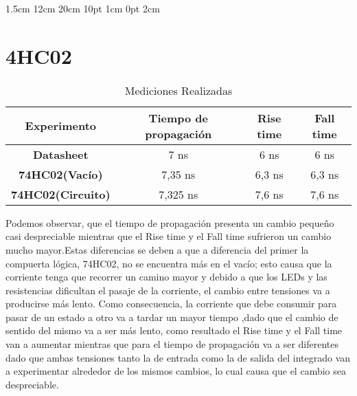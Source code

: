 \documentclass{report}
\begin{document}
\setmargins{2.5cm}   %
{1.5cm}                      %
{12cm}                       %
{20cm}                   	   %
{10pt}                        %
{1cm}                         %
{0pt}                          %
{2cm}                         %
\chapter{4HC02}
\begin{center}
	\begin{table}[h!] 	%
		\begin{center}
		\caption{Mediciones Realizadas}
			\begin{tabular}{|c|c|c|c|}
				\hline
				\textbf{Experimento} & \textbf{Tiempo de propagación} & \textbf{Rise time} & \textbf{Fall time}\\
				\hline
				\textbf{Datasheet} & 7 ns & 6 ns & 6 ns\\
				\hline
				\textbf{74HC02(Vacío)} & 7,35 ns & 6,3 ns & 6,3 ns\\
				\hline
				\textbf{74HC02(Circuito)} & 7,325 ns & 7,6 ns & 7,6 ns\\
				\hline
			\end{tabular}
		\end{center}
	\end{table}
\end{center}
Podemos observar, que el tiempo de propagación presenta un cambio pequeño casi despreciable mientras que el Rise time y el Fall time sufrieron un cambio mucho mayor.Estas diferencias se deben a que a diferencia del primer la compuerta lógica, 74HC02, no se encuentra más en el vacío; esto causa que la corriente tenga que recorrer un camino mayor y debido a que los LEDs y las resistencias dificultan el pasaje de la corriente, el cambio entre tensiones va a producirse más lento. Como consecuencia, la corriente que debe consumir para pasar de un estado a otro va a tardar un mayor tiempo ,dado que el cambio de sentido del mismo va a ser más lento, como resultado el Rise time y el Fall time van a aumentar mientras que para el tiempo de propagación va a ser diferentes dado que ambas tensiones tanto la de entrada como la de salida del integrado van a experimentar alrededor de los mismos cambios, lo cual causa que el cambio sea despreciable.\\
\end{document}
